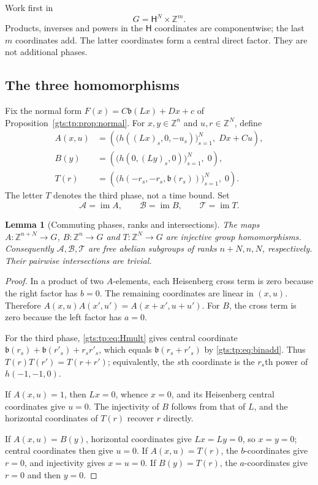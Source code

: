 \documentclass[11pt,letterpaper]{article}
\newtheorem{lemma}[theorem]{Lemma}
\theoremstyle{definition}
\theoremstyle{remark}
\newcommand{\ZZ}{\mathbb Z}
\newcommand{\HH}{\mathsf H}
\newcommand{\calA}{\mathcal A}
\newcommand{\calB}{\mathcal B}
\newcommand{\calT}{\mathcal T}
\newcommand{\bn}{\mathfrak b}
\newcommand{\im}{\operatorname{im}}
\begin{document}
Work first in
\[
                         G=\HH^N\times\ZZ^m.
\]
Products, inverses and powers in the $\HH$ coordinates are componentwise;
the last $m$ coordinates add. The latter coordinates form a central direct
factor. They are not additional phases.

\subsection{The three homomorphisms}
Fix the normal form $F(x)=C\bn(Lx)+Dx+c$ of
Proposition~\ref{gts:tp:prop:normal}. For $x,y\in\ZZ^n$ and $u,r\in\ZZ^N$, define
\begin{align}
 A(x,u)&=\left(\big(h((Lx)_s,0,-u_s)\big)_{s=1}^N,\;Dx+Cu\right),
 \label{gts:tp:eq:A}\\
 B(y)&=\left(\big(h(0,(Ly)_s,0)\big)_{s=1}^N,\;0\right),
 \label{gts:tp:eq:B}\\
 T(r)&=\left(\big(h(-r_s,-r_s,\bn(r_s))\big)_{s=1}^N,\;0\right).
 \label{gts:tp:eq:T}
\end{align}
The letter $T$ denotes the third phase, not a time bound. Set
\[
 \calA=\im A,\qquad \calB=\im B,\qquad \calT=\im T.
\]

\begin{lemma}[Commuting phases, ranks and intersections]\label{gts:tp:lem:phases}
The maps $A:\ZZ^{n+N}\to G$, $B:\ZZ^n\to G$ and $T:\ZZ^N\to G$ are
injective group homomorphisms. Consequently $\calA,\calB,\calT$ are free
abelian subgroups of ranks $n+N,n,N$, respectively. Their pairwise
intersections are trivial.
\end{lemma}
\begin{proof}
In a product of two $A$-elements, each Heisenberg cross term is zero because
the right factor has $b=0$. The remaining coordinates are linear in $(x,u)$.
Therefore $A(x,u)A(x',u')=A(x+x',u+u')$. For $B$, the cross term is zero
because the left factor has $a=0$.

For the third phase, \eqref{gts:tp:eq:Hmult} gives central coordinate
$\bn(r_s)+\bn(r'_s)+r_sr'_s$, which equals $\bn(r_s+r'_s)$ by
\eqref{gts:tp:eq:binadd}. Thus $T(r)T(r')=T(r+r')$; equivalently, the $s$th
coordinate is the $r_s$th power of $h(-1,-1,0)$.

If $A(x,u)=1$, then $Lx=0$, whence $x=0$, and its Heisenberg central
coordinates give $u=0$. The injectivity of $B$ follows from that of $L$,
and the horizontal coordinates of $T(r)$ recover $r$ directly.

If $A(x,u)=B(y)$, horizontal coordinates give $Lx=Ly=0$, so $x=y=0$;
central coordinates then give $u=0$. If $A(x,u)=T(r)$, the $b$-coordinates
give $r=0$, and injectivity gives $x=u=0$. If $B(y)=T(r)$, the
$a$-coordinates give $r=0$ and then $y=0$.
\end{proof}
\end{document}
